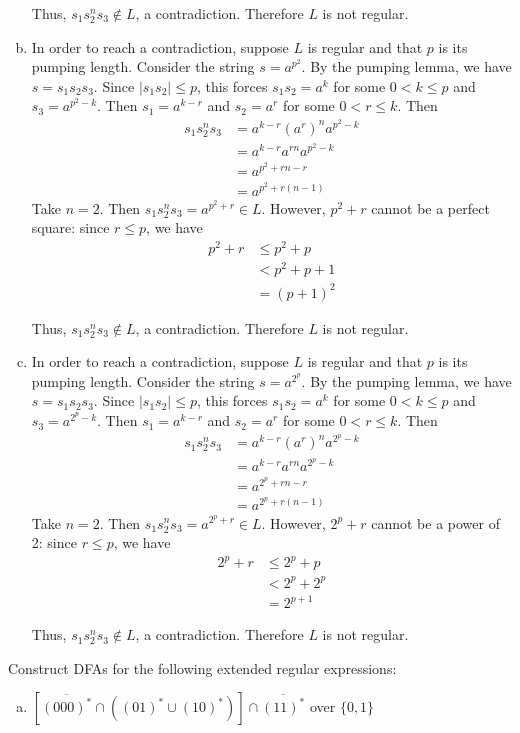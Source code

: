 \begin{solution}
\begin{enumerate}[(a)]
    Thus, \(s_1s_2^n s_3\not\in L\), a contradiction. Therefore \(L\) is not regular.
    \item In order to reach a contradiction, suppose \(L\) is regular and that \(p\) is its pumping length. Consider the string \(s=a^{p^2}\). By the pumping lemma, we have \(s=s_1s_2s_3\). Since \(|s_1s_2|\leq p\), this forces \(s_1s_2=a^k\) for some \(0<k\leq p\) and \(s_3=a^{p^2-k}\). Then \(s_1=a^{k-r}\) and \(s_2=a^r\) for some \(0<r\leq k\). Then
    \begin{align*}
        s_1s_2^n s_3 &= a^{k-r}{(a^r)}^n a^{p^2-k}\\
                    &= a^{k-r}a^{rn}a^{p^2-k}\\
                    &= a^{p^2+rn-r}\\
                    &= a^{p^2+r(n-1)}
    \end{align*}
    Take \(n=2\). Then \(s_1s_2^n s_3=a^{p^2+r}\in L\). However, \(p^2+r\) cannot be a perfect square: since \(r \leq p\), we have 
    \begin{align*}
        p^2+r &\leq p^2 + p\\
              &< p^2 + p + 1\\
              &= {(p+1)}^2
    \end{align*}
    
    Thus, \(s_1s_2^n s_3\not\in L\), a contradiction. Therefore \(L\) is not regular.
    \item In order to reach a contradiction, suppose \(L\) is regular and that \(p\) is its pumping length. Consider the string \(s=a^{2^p}\). By the pumping lemma, we have \(s=s_1s_2s_3\). Since \(|s_1s_2|\leq p\), this forces \(s_1s_2=a^k\) for some \(0<k\leq p\) and \(s_3=a^{2^p-k}\). Then \(s_1=a^{k-r}\) and \(s_2=a^r\) for some \(0<r\leq k\). Then
    \begin{align*}
        s_1s_2^n s_3 &= a^{k-r}{(a^r)}^n a^{2^p-k}\\
                    &= a^{k-r}a^{rn}a^{2^p-k}\\
                    &= a^{2^p+rn-r}\\
                    &= a^{2^p+r(n-1)}
    \end{align*}
    Take \(n=2\). Then \(s_1s_2^n s_3=a^{2^p+r}\in L\). However, \(2^p+r\) cannot be a power of 2: since \(r \leq p\), we have 
    \begin{align*}
        2^p+r &\leq 2^p + p\\
              &< 2^p + 2^p\\
              &= 2^{p+1}
    \end{align*}
    
    Thus, \(s_1s_2^n s_3\not\in L\), a contradiction. Therefore \(L\) is not regular.
\end{enumerate}
    
\end{solution}

\begin{exercise}{2}
    Construct DFAs for the following extended regular expressions:
    \begin{enumerate}[(a)]
        \item \(\left[\overline{{(000)}^*}\cap\left({(01)}^*\cup{(10)}^*\right)\right]\cap\overline{{(11)}^*}\) over \( \{0,1\} \)
    \end{enumerate}
\end{exercise}